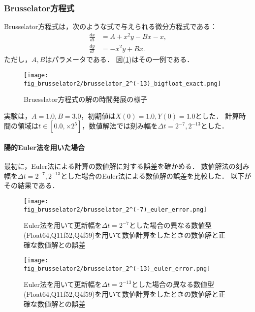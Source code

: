 \subsubsection{Brusselator方程式}
Brusselator方程式は，次のような式で与えられる微分方程式である：
\begin{align}
    \frac{dx}{dt} &= A + x^2y - Bx - x,\\
    \frac{dy}{dt} &= -x^2y + Bx.
\end{align}
ただし，$A,B$はパラメータである．
図(\ref{fig:brusselator})はその一例である．
\begin{figure}[H]
    \centering
    \begin{minipage}[b]{0.9\columnwidth}
            \texttt{[image: fig\_brusselator2/brusselator\_2^(-13)\_bigfloat\_exact.png]}
    \end{minipage}
    \caption{Bruesslator方程式の解の時間発展の様子}
    \label{fig:brusselator}
\end{figure}
実験は，$A=1.0, B=3.0$，初期値は$X(0) = 1.0, Y(0) = 1.0$とした．
計算時間の領域は$t \in [0.0, \times 2^5]$，数値解法では刻み幅を$\Delta t =  2^{-7}, 2^{-13}$とした．
\paragraph*{陽的Euler法を用いた場合}
最初に，Euler法による計算の数値解に対する誤差を確かめる．
数値解法の刻み幅を$\Delta t = 2^{-7},2^{-13}$とした場合のEuler法による数値解の誤差を比較した．
以下がその結果である．
\begin{figure}[H]
    \centering
    \begin{minipage}[b]{0.49\columnwidth}
        \centering
        \texttt{[image: fig\_brusselator2/brusselator\_2^(-7)\_euler\_error.png]}
        \caption{Euler法を用いて更新幅を$\Delta t = 2^{-7}$とした場合の異なる数値型(Float64,Q11f52,Q4f59)を用いて数値計算をしたときの数値解と正確な数値解との誤差}
        \label{fig:brusselator_2^(-7)_euler_error}
    \end{minipage}
    \begin{minipage}[b]{0.49\columnwidth}
        \centering
        \texttt{[image: fig\_brusselator2/brusselator\_2^(-13)\_euler\_error.png]}
        \caption{Euler法を用いて更新幅を$\Delta t =  2^{-13}$とした場合の異なる数値型(Float64,Q11f52,Q4f59)を用いて数値計算をしたときの数値解と正確な数値解との誤差}
        \label{fig:brusselator_2^(-13)_euler_error}
    \end{minipage}
\end{figure}

